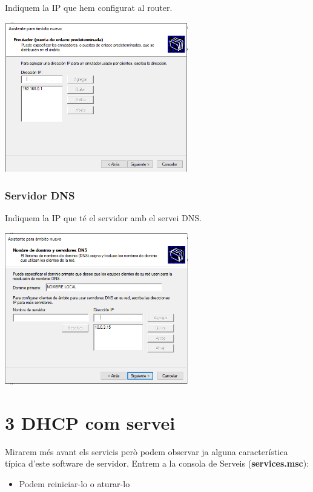 \documentclass[
  a4paper,
]{article}
\providecommand{\tightlist}{%
  \setlength{\itemsep}{0pt}\setlength{\parskip}{0pt}}
\begin{document}
Indiquem la IP que hem configurat al router.

\includegraphics[width=0.6\textwidth,height=\textheight]{png/DHCP12.png}

\subsubsection{Servidor DNS}\label{servidor-dns}

Indiquem la IP que té el servidor amb el servei DNS.

\includegraphics[width=0.6\textwidth,height=\textheight]{png/DHCP13.png}

\section{3 DHCP com servei}\label{dhcp-com-servei}

Mirarem més avant els servicis però podem observar ja alguna
característica típica d'este software de servidor. Entrem a la consola
de Serveis (\textbf{services.msc}):

\begin{itemize}
\tightlist
\item
  Podem reiniciar-lo o aturar-lo
\end{itemize}
\end{document}
